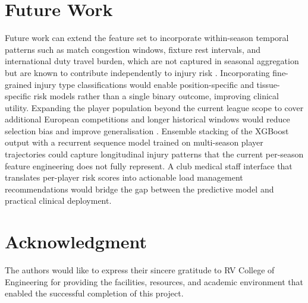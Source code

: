 \documentclass[conference]{IEEEtran}
\begin{document}
\section*{Future Work}
Future work can extend the feature set to incorporate within-season temporal patterns such as match congestion windows, fixture rest intervals, and international duty travel burden, which are not captured in seasonal aggregation but are known to contribute independently to injury risk \cite{gabbett2016training}. Incorporating fine-grained injury type classifications would enable position-specific and tissue-specific risk models rather than a single binary outcome, improving clinical utility. Expanding the player population beyond the current league scope to cover additional European competitions and longer historical windows would reduce selection bias and improve generalisation \cite{claudino2019current}. Ensemble stacking of the XGBoost output with a recurrent sequence model trained on multi-season player trajectories could capture longitudinal injury patterns that the current per-season feature engineering does not fully represent. A club medical staff interface that translates per-player risk scores into actionable load management recommendations would bridge the gap between the predictive model and practical clinical deployment.

\section*{Acknowledgment}

The authors would like to express their sincere gratitude to RV College of Engineering for providing the facilities, resources, and academic environment that enabled the successful completion of this project.
\end{document}
